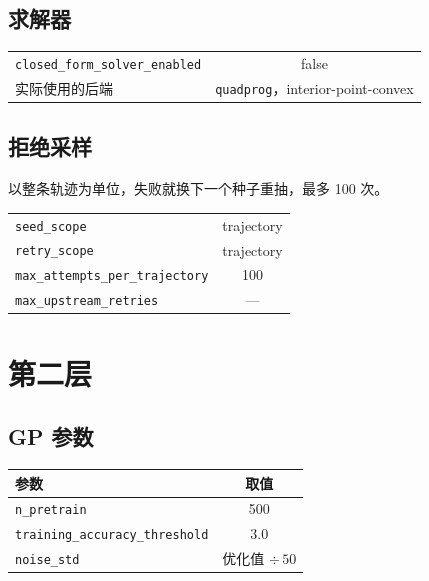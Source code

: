 \documentclass[11pt,a4paper]{ctexart}
\newcommand{\cf}[1]{\texttt{\small #1}}
\begin{document}
\subsection{求解器}
\begin{center}
\small
\begin{tabular}{@{}lc@{}}
\toprule
\cf{closed\_form\_solver\_enabled} & false \\
实际使用的后端 & \cf{quadprog}，interior-point-convex \\
\bottomrule
\end{tabular}
\end{center}

\subsection{拒绝采样}
以整条轨迹为单位，失败就换下一个种子重抽，最多 100 次。

\begin{center}
\small
\begin{tabular}{@{}lc@{}}
\toprule
\cf{seed\_scope} & trajectory \\
\cf{retry\_scope} & trajectory \\
\cf{max\_attempts\_per\_trajectory} & 100 \\
\cf{max\_upstream\_retries} & --- \\
\bottomrule
\end{tabular}
\end{center}

\section{第二层}

\subsection{GP 参数}
\begin{center}
\small
\begin{tabular}{@{}lc@{}}
\toprule
\textbf{参数} & \textbf{取值} \\
\midrule
\cf{n\_pretrain} & 500 \\
\cf{training\_accuracy\_threshold} & 3.0 \\
\cf{noise\_std} & 优化值 $\div\,50$ \\
\bottomrule
\end{tabular}
\end{center}
\end{document}
